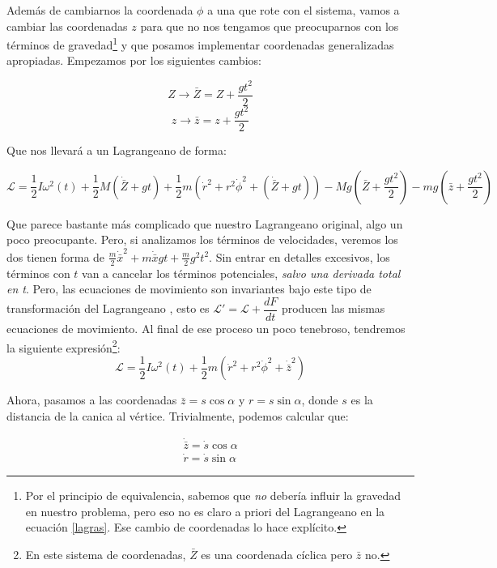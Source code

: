 \documentclass[a4paper,12pt]{article}
\begin{document}
Además de cambiarnos la coordenada $\phi$ a una que rote con el sistema, vamos a cambiar las coordenadas $z$ para que no nos tengamos que preocuparnos con los términos de gravedad\footnote{Por el principio de equivalencia, sabemos que \textit{no} debería influir la gravedad en nuestro problema, pero eso no es claro a priori del Lagrangeano en la ecuación \eqref{lagras}. Ese cambio de coordenadas lo hace explícito.} y que posamos implementar coordenadas generalizadas apropiadas. Empezamos por los siguientes cambios:

$$Z \to \bar{Z} = Z +\frac{ gt^{2}}{2}$$
$$z \to \bar{z} = z +\frac{ gt^{2}}{2} $$

Que nos llevará a un Lagrangeano de forma:

$$\mathcal{L} = \frac{1}{2} I \omega^2(t) + \frac{1}{2} M \left(\dot{\bar{Z}}+gt\right) + \frac{1}{2} m  \left(\dot{r}^2 + r^2 \dot{\phi}^2+\left(\dot{\bar{Z}}+gt\right)\right) - M g \left(\bar{Z}+\frac{ gt^{2}}{2}\right) - mg\left(\bar{z}+\frac{ gt^{2}}{2}\right)$$

Que parece bastante más complicado que nuestro Lagrangeano original, algo un poco preocupante. Pero, si analizamos los términos de velocidades, veremos los dos tienen forma de $\frac{m}{2}\dot{\bar{x}}^2 + m\dot{\bar{x}} gt + \frac{m}{2} g^2 t^2$. Sin entrar en detalles excesivos, los términos con $t$ van a cancelar los términos potenciales, \textit{salvo una derivada total en t}. Pero, las ecuaciones de movimiento son invariantes bajo este tipo de transformación del Lagrangeano , esto es $\mathcal{L}' = \mathcal{L} + \dfrac{d F}{dt}$ producen las mismas ecuaciones de movimiento. Al final de ese proceso un poco tenebroso, tendremos la siguiente expresión\footnote{En este sistema de coordenadas, $\bar{Z}$ es una coordenada cíclica pero $\bar{z}$ no.}:
\begin{equation}
\mathcal{L} = \frac{1}{2} I \omega^2(t)+ \frac{1}{2} m  (\dot{r}^2 + r^2 \dot{\phi}^2+\dot{\bar{z}}^2)
\end{equation}

Ahora, pasamos a las coordenadas $\bar{z} = s \cos\alpha$ y $r = s \sin\alpha $, donde $s$ es la distancia de la canica al vértice. Trivialmente, podemos calcular que:

\begin{equation*}
  \begin{aligned}
    \dot{\bar{z}} = \dot{s} \cos{\alpha}\\
    \dot{r} = \dot{s} \sin\alpha
  \end{aligned}
\end{equation*}
\end{document}
